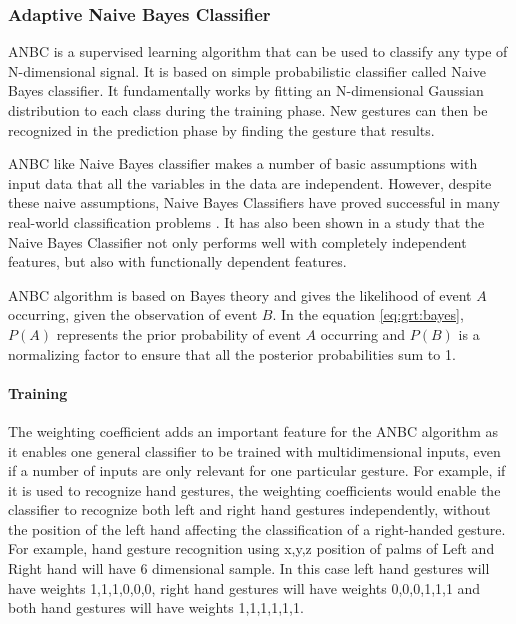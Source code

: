 \subsubsection{Adaptive Naive Bayes Classifier} \label{sec:anbc} ANBC \cite{14} is a supervised learning algorithm that can be used to classify any type of N-dimensional signal. It is based on simple probabilistic classifier called Naive Bayes classifier. It fundamentally works by fitting an N-dimensional Gaussian distribution to each class during the training phase. New gestures can then be recognized in the prediction phase by finding the gesture that results.

ANBC like Naive Bayes classifier makes a number of basic assumptions with input data that all the variables in the data are independent. However, despite these naive assumptions, Naive Bayes Classifiers have proved successful in many real-world classification problems \cite{15}. It has also been shown in a study that the Naive Bayes Classifier not only performs well with completely independent features, but also with functionally dependent features.

ANBC algorithm is based on Bayes theory and gives the likelihood of event $A$ occurring, given the observation of event $B$. In the equation \ref{eq:grt:bayes}, $P(A)$ represents the prior probability of event $A$ occurring and $P(B)$ is a normalizing factor to ensure that all the posterior probabilities sum to 1.



\paragraph*{Training} The weighting coefficient adds an important feature for the ANBC algorithm as it enables one general classifier to be trained with multidimensional inputs, even if a number of inputs are only relevant for one particular gesture. For example, if it is used to recognize hand gestures, the weighting coefficients would enable the classifier to recognize both left and right hand gestures independently, without the position of the left hand affecting the classification of a right-handed gesture. For example, hand gesture recognition using x,y,z position of palms of Left and Right hand will have 6 dimensional sample. In this case left hand gestures will have weights {1,1,1,0,0,0}, right hand gestures will have weights {0,0,0,1,1,1} and both hand gestures will have weights {1,1,1,1,1,1}.


